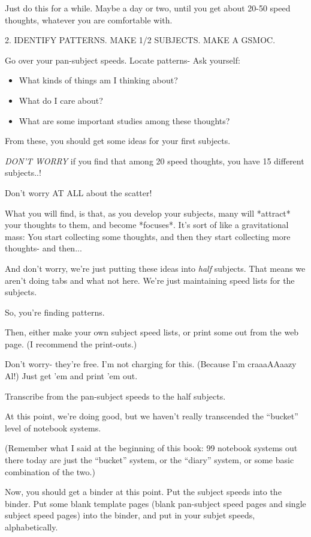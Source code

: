 \documentclass[oneside]{book}
\begin{document}
Just do this for a while. Maybe a day or two, until you get about
20-50 speed thoughts, whatever you are comfortable with.


2. IDENTIFY PATTERNS.
   MAKE 1/2 SUBJECTS.
   MAKE A GSMOC.

Go over your pan-subject speeds. Locate patterns-
Ask yourself:

\begin{itemize}
\item What kinds of things am I thinking about?
\item What do I care about?
\item What are some important studies among these thoughts?
\end{itemize}

From these, you should get some ideas for your first subjects.

\emph{DON'T WORRY} if you find that among 20 speed thoughts, you have 15
 different subjects..!

Don't worry AT ALL about the scatter!

What you will find, is that, as you develop your subjects, many will
*attract* your thoughts to them, and become *focuses*. It's sort of
like a gravitational mass: You start collecting some thoughts, and
then they start collecting more thoughts- and then...

And don't worry, we're just putting these ideas into \emph{half}
subjects. That means we aren't doing tabs and what not here. We're
just maintaining speed lists for the subjects.

So, you're finding patterns.

Then, either make your own subject speed lists, or print some out
from the web page. (I recommend the print-outs.)

Don't worry- they're free. I'm not charging for this. (Because I'm
craaaAAaazy Al!) Just get 'em and print 'em out.

Transcribe from the pan-subject speeds to the half subjects.

At this point, we're doing good, but we haven't really transcended the
``bucket'' level of notebook systems.

(Remember what I said at the beginning of this book: 99%
notebook systems out there today are just the ``bucket'' system, or the
``diary'' system, or some basic combination of the two.)

Now, you should get a binder at this point. Put the subject speeds
into the binder. Put some blank template pages (blank pan-subject
speed pages and single subject speed pages) into the binder, and put
in your subjet speeds, alphabetically.
\end{document}
